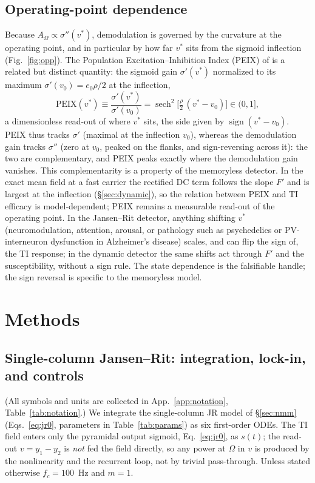 \documentclass[11pt,a4paper]{article}
\newcommand{\Sig}{\sigma}
\providecommand{\DIFdelend}{} %
\begin{document}
\DIFdelend \subsection{Operating-point dependence}\label{sec:opp}
Because $A_\Omega\propto\Sig''(v^*)$, demodulation is governed by the curvature at
the operating point, and in particular by how far $v^*$ sits from the sigmoid
inflection (Fig.~\ref{fig:opp}). The Population Excitation--Inhibition Index (PEIX)
of \cite{ruffini2025cfc} is a related but distinct quantity: the sigmoid gain
$\Sig'(v^*)$ normalized to its maximum $\Sig'(v_0)=e_0 \rho/2$ at the inflection,
\begin{equation}
\mathrm{PEIX}(v^*)\equiv\frac{\Sig'(v^*)}{\Sig'(v_0)}
=\operatorname{sech}^2\!\Big[\tfrac{\rho}{2}\,(v^*-v_0)\Big]\in(0,1],
\label{eq:peix}
\end{equation}
a dimensionless read-out of where $v^*$ sits, the side given by
$\operatorname{sign}(v^*-v_0)$. PEIX thus tracks $\Sig'$ (maximal at the inflection
$v_0$), whereas the demodulation gain tracks $\Sig''$ (zero at $v_0$, peaked on the
flanks, and sign-reversing across it): the two are complementary, and PEIX peaks
exactly where the demodulation gain vanishes. This complementarity is a property of the
memoryless detector. In the exact mean field at a fast carrier the rectified DC term
follows the slope $F'$ and is largest at the inflection (\S\ref{sec:dynamic}), so the
relation between PEIX and TI efficacy is model-dependent; PEIX remains a measurable
read-out of the operating point. In the Jansen--Rit detector, anything shifting $v^*$
(neuromodulation, attention, arousal, or pathology such as psychedelics or PV-interneuron
dysfunction in Alzheimer's disease) scales, and can flip the sign of, the TI response; in
the dynamic detector the same shifts act through $F'$ and the susceptibility, without a
sign rule. The state dependence is the falsifiable handle; the sign reversal is specific
to the memoryless model.


\section{Methods}

\subsection{Single-column Jansen--Rit: integration, lock-in, and controls}
(All symbols and units are collected in App.~\ref{app:notation},
Table~\ref{tab:notation}.) We integrate the single-column JR model of \S\ref{sec:nmm}
(Eqs.~\eqref{eq:jr0}, parameters in Table~\ref{tab:params}) as six first-order
ODEs. The TI field enters only the pyramidal output sigmoid, Eq.~\eqref{eq:jr0},
as $s(t)$; the read-out $v=y_1-y_2$ is \emph{not} fed the field directly, so any
power at $\Omega$ in $v$ is produced by the nonlinearity and the recurrent loop,
not by trivial pass-through. Unless stated otherwise $f_c=100$~Hz and $m=1$.
\end{document}
